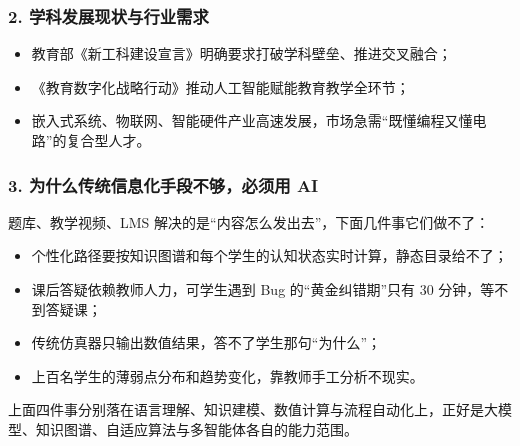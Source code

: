 \documentclass[zihao=-4,a4paper,UTF8,fontset=windows]{ctexart}
\begin{document}
\subsubsection{2. 学科发展现状与行业需求}
\begin{itemize}[leftmargin=2em,itemsep=0pt,topsep=0pt]
\item 教育部《新工科建设宣言》明确要求打破学科壁垒、推进交叉融合；
\end{itemize}
\begin{itemize}[leftmargin=2em,itemsep=0pt,topsep=0pt]
\item 《教育数字化战略行动》推动人工智能赋能教育教学全环节；
\end{itemize}
\begin{itemize}[leftmargin=2em,itemsep=0pt,topsep=0pt]
\item 嵌入式系统、物联网、智能硬件产业高速发展，市场急需“既懂编程又懂电路”的复合型人才。
\end{itemize}
\subsubsection{3. 为什么传统信息化手段不够，必须用 AI}


题库、教学视频、LMS 解决的是“内容怎么发出去”，下面几件事它们做不了：

\begin{itemize}[leftmargin=2em,itemsep=0pt,topsep=0pt]
\item 个性化路径要按知识图谱和每个学生的认知状态实时计算，静态目录给不了；
\end{itemize}
\begin{itemize}[leftmargin=2em,itemsep=0pt,topsep=0pt]
\item 课后答疑依赖教师人力，可学生遇到 Bug 的“黄金纠错期”只有 30 分钟，等不到答疑课；
\end{itemize}
\begin{itemize}[leftmargin=2em,itemsep=0pt,topsep=0pt]
\item 传统仿真器只输出数值结果，答不了学生那句“为什么”；
\end{itemize}
\begin{itemize}[leftmargin=2em,itemsep=0pt,topsep=0pt]
\item 上百名学生的薄弱点分布和趋势变化，靠教师手工分析不现实。
\end{itemize}


上面四件事分别落在语言理解、知识建模、数值计算与流程自动化上，正好是大模型、知识图谱、自适应算法与多智能体各自的能力范围。
\end{document}
